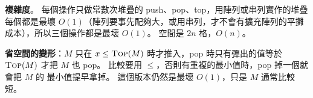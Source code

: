 \begin{pastsoln}
\textbf{複雜度}。 每個操作只做常數次堆疊的 push、pop、top，用陣列或串列實作的堆疊每個都是最壞
$O(1)$（陣列要事先配夠大，或用串列，才不會有擴充陣列的平攤成本），所以三個操作都是最壞 $O(1)$。
空間是 $2n$ 格，$O(n)$。

\textbf{省空間的變形}：$M$ 只在 $x \le \textsc{Top}(M)$ 時才推入，pop 時只有彈出的值等於
$\textsc{Top}(M)$ 才把 $M$ 也 pop。 比較要用 $\le$，否則有重複的最小值時，pop 掉一個就會把 $M$ 的
最小值提早拿掉。 這個版本仍然是最壞 $O(1)$，只是 $M$ 通常比較短。
\end{pastsoln}
